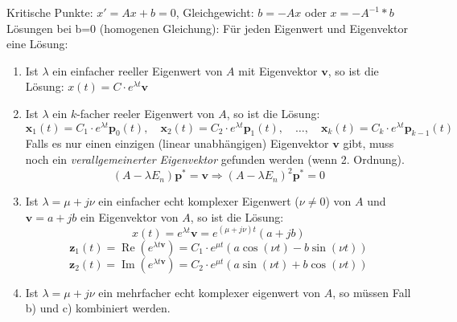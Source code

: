 Kritische Punkte: $x' = Ax + b = 0$, Gleichgewicht: $b = -Ax$ oder $x = -A^{-1}*b$\\
Lösungen bei b=0 (homogenen Gleichung): Für jeden Eigenwert und Eigenvektor eine Lösung: \\
\begin{enumerate}[label=\alph*)]
    \item Ist $\lambda$ ein einfacher reeller Eigenwert von $A$ mit Eigenvektor $\textbf{v}$, so ist die Lösung: $x(t) = C \cdot e^{\lambda t}\textbf{v}$ 
    \item Ist $\lambda$ ein $k$-facher reeler Eigenwert von $A$, so ist die Lösung: \\ \begin{equation*}
    	\textbf{x}_1(t) = C_1 \cdot e^{\lambda t}\textbf{p}_0(t), \quad \textbf{x}_2(t) = C_2 \cdot e^{\lambda t}\textbf{p}_1(t), \quad \dots, \quad \textbf{x}_k(t) = C_k \cdot e^{\lambda t} \textbf{p}_{k-1}(t)
    \end{equation*}
    Falls es nur einen einzigen (linear unabhängigen) Eigenvektor $\textbf{v}$ gibt, muss noch ein \textit{verallgemeinerter Eigenvektor} gefunden werden (wenn 2. Ordnung).
    \begin{equation*}
    	(A - \lambda E_n)\textbf{p}^* = \textbf{v} \Rightarrow (A-\lambda E_n)^2 \textbf{p}^* = 0
    \end{equation*}
    \item Ist $\lambda = \mu + j\nu$ ein einfacher echt komplexer Eigenwert ($\nu \neq 0$) von $A$ und $\textbf{v} = a + jb$ ein Eigenvektor von $A$, so ist die Lösung: \\
    \begin{equation*}
		x(t) = e^{\lambda t}\textbf{v} = e^{(\mu + j\nu)t} \left(a + jb\right)
    \end{equation*}
    \begin{equation*}
    	\textbf{z}_1(t) = \operatorname{Re} (e^{\lambda t \textbf{v}}) = C_1 \cdot e^{\mu t} \left(a \cos(\nu t) - b \sin(\nu t)\right)
    \end{equation*}
	\begin{equation*}
    	\textbf{z}_2(t)= \operatorname{Im} (e^{\lambda t \textbf{v}}) = C_2 \cdot e^{\mu t} \left(a \sin(\nu t) + b \cos(\nu t)\right)
    \end{equation*}
    \item Ist $\lambda = \mu + j\nu$ ein mehrfacher echt komplexer eigenwert von $A$, so müssen Fall b) und c) kombiniert werden.
\end{enumerate}

